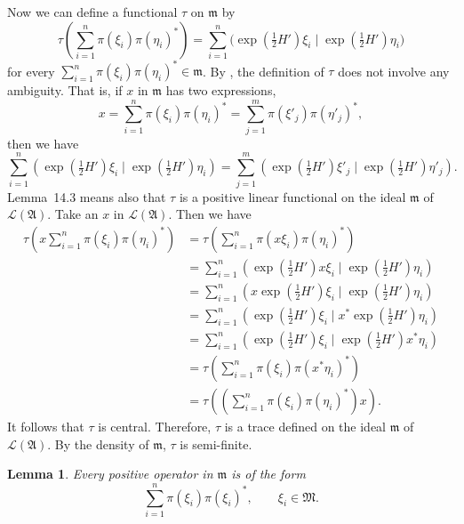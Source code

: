 \documentclass[12pt,b5paper,twoside]{article}
\theoremstyle{takesaki}
\newtheorem{lemma}{Lemma}[section]
\numberwithin{equation}{section}
\begin{document}
Now we can define a functional $\tau$ on $\mathfrak m$ by
\begin{equation}
 \tau\!\left(\sum_{i=1}^{n}\pi(\xi_i)\pi(\eta_i)^*\right)
  =\sum_{i=1}^{n}
   \bigl(\exp(\tfrac12H')\xi_i
      \mid\exp(\tfrac12H')\eta_i\bigr)
 \tag{14.12}\label{eq:14.12}
\end{equation}
for every
$\sum_{i=1}^{n}\pi(\xi_i)\pi(\eta_i)^*\in\mathfrak m$.
By , the definition of $\tau$ does not involve any
ambiguity.  That is, if $x$ in $\mathfrak m$ has two expressions,
\[
 x=\sum_{i=1}^{n}\pi(\xi_i)\pi(\eta_i)^*
  =\sum_{j=1}^{m}\pi(\xi'_j)\pi(\eta'_j)^*,
\]
then we have
\[
 \sum_{i=1}^{n}
  (\exp(\tfrac12H')\xi_i\mid\exp(\tfrac12H')\eta_i)
 =\sum_{j=1}^{m}
  (\exp(\tfrac12H')\xi'_j\mid\exp(\tfrac12H')\eta'_j).
\]
Lemma~14.3 means also that $\tau$ is a positive linear functional on
the ideal $\mathfrak m$ of $\mathcal L(\mathfrak A)$.  Take an $x$ in
$\mathcal L(\mathfrak A)$.  Then we have
\begin{align*}
 \tau\!\left(x\sum_{i=1}^{n}\pi(\xi_i)\pi(\eta_i)^*\right)
 &=\tau\!\left(\sum_{i=1}^{n}\pi(x\xi_i)\pi(\eta_i)^*\right)\\
 &=\sum_{i=1}^{n}
  (\exp(\tfrac12H')x\xi_i\mid\exp(\tfrac12H')\eta_i)\\
 &=\sum_{i=1}^{n}
  (x\exp(\tfrac12H')\xi_i\mid\exp(\tfrac12H')\eta_i)\\
 &=\sum_{i=1}^{n}
  (\exp(\tfrac12H')\xi_i\mid x^*\exp(\tfrac12H')\eta_i)\\
 &=\sum_{i=1}^{n}
  (\exp(\tfrac12H')\xi_i\mid\exp(\tfrac12H')x^*\eta_i)\\
 &=\tau\!\left(\sum_{i=1}^{n}\pi(\xi_i)\pi(x^*\eta_i)^*\right)\\
 &=\tau\!\left(\left(\sum_{i=1}^{n}
       \pi(\xi_i)\pi(\eta_i)^*\right)x\right).
\end{align*}
It follows that $\tau$ is central.  Therefore, $\tau$ is a trace
defined on the ideal $\mathfrak m$ of $\mathcal L(\mathfrak A)$.  By
the density of $\mathfrak m$, $\tau$ is semi-finite.

\begin{lemma}\label{lem:14.4}
Every positive operator in $\mathfrak m$ is of the form
\[
  \sum_{i=1}^{n}\pi(\xi_i)\pi(\xi_i)^*,
  \qquad \xi_i\in\mathfrak M.
\]
\end{lemma}
\end{document}
